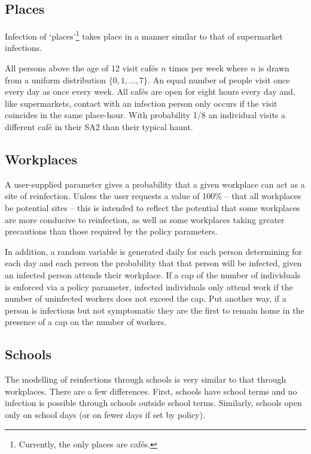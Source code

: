 \documentclass[submission]{grattan}
\begin{document}
\subsection{Places}

Infection of `places'\footnote{Currently, the only places are caf\'{e}s.}
takes place in a manner similar to that of supermarket infections.

All persons above the age of 12 visit caf\'es \(n\)
times per week where \(n\) is drawn from a
uniform distribution \(\{0, 1, \dots, 7\}\). An equal number of people
visit once every day as once every week. All caf\'es are open for eight
hours every day and, like supermarkets, contact with an infection person
only occurs if the visit coincides in the same place-hour. With probability
1/8 an individual visits a different caf\'e in their SA2 than their typical
haunt.

\subsection{Workplaces}

A user-supplied parameter gives a probability that a given workplace can act as a site
of reinfection. Unless the user requests a value of 100\% -- that all workplaces
be potential sites -- this is intended to reflect the potential that some workplaces are more
conducive to reinfection, as well as some workplaces taking greater precautions than those
required by the policy parameters.

In addition, a random variable is generated daily for each person determining for each day
and each person the probability that that person will be infected, given an infected person
attends their workplace. If a cap of the number of individuals is enforced via a policy
parameter, infected individuals only attend work if the number of uninfected workers does
not exceed the cap. Put another way, if a person is infectious but not symptomatic they are
the first to remain home in the presence of a cap on the number of workers.

\subsection{Schools}

The modelling of reinfections through schools is very similar to that through workplaces.
There are a few differences.
First, schools have school terms and no infection is possible through schools outside school terms.
Similarly, schools open only on school days (or on fewer days if set by policy).
\end{document}
